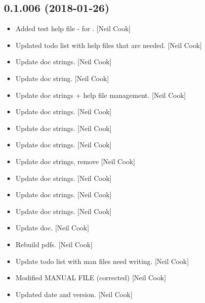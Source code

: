 \documentclass[a4paper,10pt,english]{report}
\begin{document}
\subsection{0.1.006 (2018-01-26)}
\label{\detokenize{misc/changelog:id497}}\begin{itemize}
\item {} 
Added test help file - for . {[}Neil Cook{]}

\item {} 
Updated todo list with help files that are needed. {[}Neil Cook{]}

\item {} 
Update doc strings. {[}Neil Cook{]}

\item {} 
Update doc string. {[}Neil Cook{]}

\item {} 
Update doc strings + help file management. {[}Neil Cook{]}

\item {} 
Update doc strings. {[}Neil Cook{]}

\item {} 
Update doc strings. {[}Neil Cook{]}

\item {} 
Update doc strings. {[}Neil Cook{]}

\item {} 
Update doc strings, remove  {[}Neil Cook{]}

\item {} 
Update doc strings. {[}Neil Cook{]}

\item {} 
Update doc strings. {[}Neil Cook{]}

\item {} 
Update doc strings. {[}Neil Cook{]}

\item {} 
Update doc. {[}Neil Cook{]}

\item {} 
Rebuild pdfs. {[}Neil Cook{]}

\item {} 
Update todo list with man files need writing. {[}Neil Cook{]}

\item {} 
Modified MANUAL FILE (corrected) {[}Neil Cook{]}

\item {} 
Updated date and version. {[}Neil Cook{]}


\end{itemize}
\end{document}
